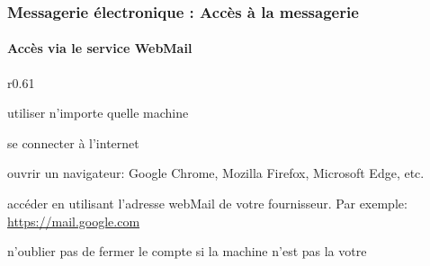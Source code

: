 \documentclass[xcolor=table]{beamer}
\begin{document}
\begin{frame}
\frametitle{Messagerie électronique : Accès à la messagerie}
\framesubtitle{Accès via le service WebMail}

\begin{wrapfigure}{r}{0.61\textwidth}
	\vspace{-1cm}
	\vspace{-1cm}
\end{wrapfigure}


\mysphere utiliser n'importe quelle machine

\mysphere se connecter à l'internet

\mysphere ouvrir un navigateur: Google Chrome, Mozilla Firefox, Microsoft Edge, etc.  

\mysphere accéder en utilisant l'adresse webMail de votre fournisseur. 
Par exemple: \url{https://mail.google.com}

\mysphere n'oublier pas de fermer le compte si la machine n'est pas la votre



\end{frame}
\end{document}
